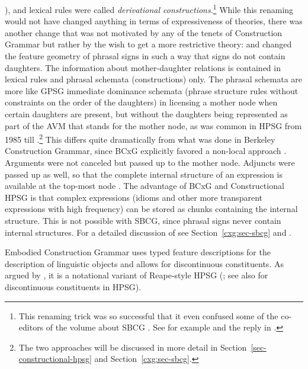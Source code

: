 \documentclass[output=paper,biblatex,babelshorthands,newtxmath,draftmode,colorlinks,citecolor=brown]{langscibook}
\begin{document}
), and lexical rules were called \emph{derivational constructions}.\footnote{
This renaming trick was so successful that it even confused some of the co-editors of the volume about
SBCG \citep{BS2012a-ed}. See for example  and the reply in .
}
While this renaming would not have changed anything in terms of expressiveness of theories, there
was another change that was not motivated by any of the tenets of Construction Grammar but rather by
the wish to get a more restrictive theory: \citet*{SWB2003a} and \citet{Sag2007a} changed the feature geometry of phrasal
signs in such a way that signs do not contain daughters. The information about mother-daughter relations
is contained in lexical rules and phrasal schemata (constructions) only. The phrasal schemata are
more like GPSG immediate dominance schemata (phrase structure rules without constraints on the order of the daughters) in licensing a mother node when certain daughters are present,
but without the daughters being represented as part of the AVM that stands for the mother node, as
was common in HPSG from 1985 till .\footnote{%
  The two approaches will be discussed in more detail in Section~\ref{sec-constructional-hpsg} and Section~\ref{cxg:sec-sbcg}.
}
This differs quite dramatically from what was done in Berkeley Construction
Grammar, since BCxG explicitly favored a non-local approach \parencites[]{Fillmore88a}[]{FKoC88a}. Arguments were not canceled but
passed up to the mother node. Adjuncts were passed up as well, so that the complete internal
structure of an expression is available at the top-most node \citep[]{KF99a}. The advantage of BCxG and
Constructional HPSG \citep{Sag97a} is that complex expressions (\eg idioms and other more transparent expressions
with high frequency) can be stored as chunks containing the internal structure. This is not possible
with SBCG, since phrasal signs never contain internal structures. For a detailed discussion of \sbcg
see Section~\ref{cxg:sec-sbcg} and .

Embodied Construction Grammar \citep{BC2005a} uses typed feature descriptions for the description of
linguistic objects and allows for discontinuous constituents. As
argued by \citet[Section~10.6.3]{MuellerGT-Eng1}, it is a notational variant of Reape-style HPSG
(\citealt{Reape94a}; see also  for discontinuous constituents in HPSG).
\end{document}
